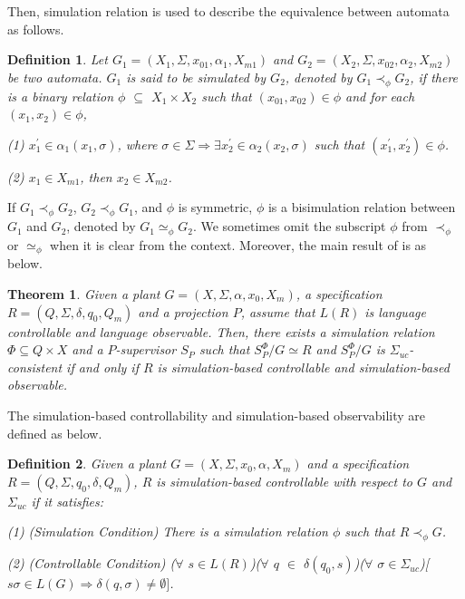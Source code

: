 \documentclass[12pt,draftcls,onecolumn]{IEEEtran}
\newtheorem{Theorem}{Theorem}
\newtheorem{Definition}{Definition}
\begin{document}
Then, simulation relation is used to describe the equivalence
between automata as follows.
\begin{Definition}
Let $G_{1} =(X_{1},\Sigma,x_{01},\alpha_{1},X_{m1})$ and $G_{2}
=(X_{2},\Sigma,x_{02},\alpha_{2},X_{m2})$ be two automata. $G_{1}$
is said to be simulated by $G_{2}$, denoted by $G_{1} \prec_{\phi}
G_{2}$, if there is a binary relation $\phi$ $\subseteq$ $X_{1}
\times X_{2}$ such that $(x_{01},x_{02}) \in \phi$ and for each
$(x_{1}, x_{2}) \in \phi$,

(1) $x_{1}^{'} \in \alpha_{1}(x_{1},\sigma)$, where $\sigma \in
\Sigma \Rightarrow \exists x_{2}^{'} \in \alpha_{2}(x_{2},\sigma)$
such that $(x_{1}^{'},x_{2}^{'}) \in \phi$.

(2) $x_{1} \in X_{m1} $, then $x_{2} \in X_{m2} $.

\end{Definition}
If $G_{1} \prec_{\phi} G_{2}$, $G_{2} \prec_{\phi} G_{1}$, and
$\phi$ is symmetric, $\phi$ is a bisimulation relation between
$G_{1}$ and $G_{2}$, denoted by $G_{1} \simeq_{\phi} G_{2}$. We
sometimes omit the subscript $\phi$ from $\prec_{\phi}$ or
$\simeq_{\phi}$ when it is clear from the context. Moreover, the
main result of \cite{liu} is as below.

\begin{Theorem}\label{tliu}
Given a plant $G=(X,\Sigma,\alpha,x_{0},X_{m})$, a specification
$R=(Q,\Sigma,\delta,q_{0},Q_{m})$ and a projection $P$, assume
that $L(R)$ is language controllable and language observable.
Then, there exists a simulation relation $\Phi\subseteq Q\times X$
and a $P$-supervisor $S_{P}$ such that $S_{P}^{\Phi}/G\simeq R$
and $S_{P}^{\Phi}/G$ is $\Sigma_{uc}$-consistent if and only if
$R$ is simulation-based controllable and simulation-based
observable.
\end{Theorem}

The simulation-based controllability and simulation-based
observability are defined as below.





\begin{Definition}
Given a plant $G =(X,\Sigma,x_{0},\alpha,X_{m})$ and a
specification $R =(Q,\Sigma,q_{0},\delta,Q_{m})$, $R$ is
simulation-based controllable with respect to $G$ and
$\Sigma_{uc}$ if it satisfies:

(1) (Simulation Condition) There is a simulation relation $\phi$
such that $R \prec_{\phi} G$.

(2) (Controllable Condition) ($\forall$ $s\in L(R)$)($\forall$ $q$
$\in$ $\delta(q_{0},s)$)($\forall$ $\sigma \in
\Sigma_{uc}$)[$s\sigma \in L(G) \Rightarrow \delta(q,\sigma) \neq
\emptyset]$.
\end{Definition}
\end{document}
